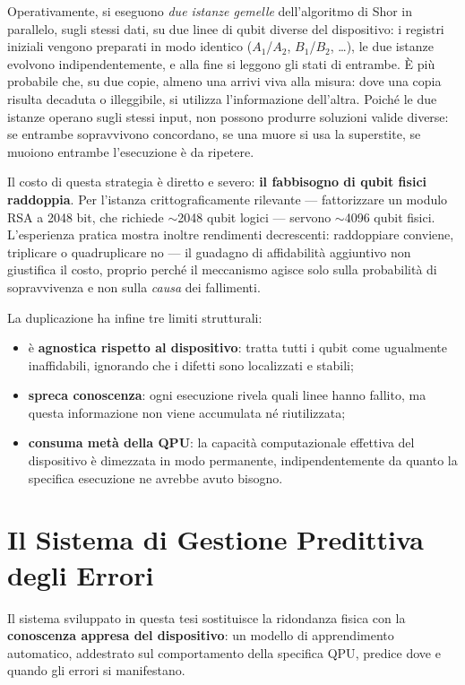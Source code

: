 \begin{onehalfspace}
Operativamente, si eseguono \emph{due istanze gemelle} dell'algoritmo di Shor in parallelo, sugli stessi dati, su due linee di qubit diverse del dispositivo: i registri iniziali vengono preparati in modo identico ($A_1$/$A_2$, $B_1$/$B_2$, \ldots), le due istanze evolvono indipendentemente, e alla fine si leggono gli stati di entrambe. È più probabile che, su due copie, almeno una arrivi viva alla misura: dove una copia risulta decaduta o illeggibile, si utilizza l'informazione dell'altra. Poiché le due istanze operano sugli stessi input, non possono produrre soluzioni valide diverse: se entrambe sopravvivono concordano, se una muore si usa la superstite, se muoiono entrambe l'esecuzione è da ripetere.

Il costo di questa strategia è diretto e severo: \textbf{il fabbisogno di qubit fisici raddoppia}. Per l'istanza crittograficamente rilevante --- fattorizzare un modulo RSA a 2048 bit, che richiede $\sim$2048 qubit logici --- servono $\sim$4096 qubit fisici. L'esperienza pratica mostra inoltre rendimenti decrescenti: raddoppiare conviene, triplicare o quadruplicare no --- il guadagno di affidabilità aggiuntivo non giustifica il costo, proprio perché il meccanismo agisce solo sulla probabilità di sopravvivenza e non sulla \emph{causa} dei fallimenti.

La duplicazione ha infine tre limiti strutturali:
\begin{itemize}
    \item è \textbf{agnostica rispetto al dispositivo}: tratta tutti i qubit come ugualmente inaffidabili, ignorando che i difetti sono localizzati e stabili;
    \item \textbf{spreca conoscenza}: ogni esecuzione rivela quali linee hanno fallito, ma questa informazione non viene accumulata né riutilizzata;
    \item \textbf{consuma metà della QPU}: la capacità computazionale effettiva del dispositivo è dimezzata in modo permanente, indipendentemente da quanto la specifica esecuzione ne avrebbe avuto bisogno.
\end{itemize}

\section{Il Sistema di Gestione Predittiva degli Errori}
\label{sec:proposta_predittiva}

Il sistema sviluppato in questa tesi sostituisce la ridondanza fisica con la \textbf{conoscenza appresa del dispositivo}: un modello di apprendimento automatico, addestrato sul comportamento della specifica \ac{QPU}, predice dove e quando gli errori si manifestano.


\end{onehalfspace}
